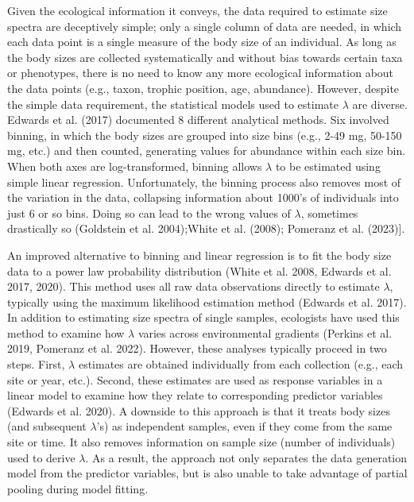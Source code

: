 \documentclass[
  12pt,
]{article}
\begin{document}
Given the ecological information it conveys, the data required to
estimate size spectra are deceptively simple; only a single column of
data are needed, in which each data point is a single measure of the
body size of an individual. As long as the body sizes are collected
systematically and without bias towards certain taxa or phenotypes,
there is no need to know any more ecological information about the data
points (e.g., taxon, trophic position, age, abundance). However, despite
the simple data requirement, the statistical models used to estimate
\(\lambda\) are diverse. Edwards et al. (2017) documented 8 different
analytical methods. Six involved binning, in which the body sizes are
grouped into size bins (e.g., 2-49 mg, 50-150 mg, etc.) and then
counted, generating values for abundance within each size bin. When both
axes are log-transformed, binning allows \(\lambda\) to be estimated
using simple linear regression. Unfortunately, the binning process also
removes most of the variation in the data, collapsing information about
1000's of individuals into just 6 or so bins. Doing so can lead to the
wrong values of \(\lambda\), sometimes drastically so (Goldstein et al.
2004);White et al. (2008); Pomeranz et al. (2023){]}.

An improved alternative to binning and linear regression is to fit the
body size data to a power law probability distribution (White et al.
2008, Edwards et al. 2017, 2020). This method uses all raw data
observations directly to estimate \(\lambda\), typically using the
maximum likelihood estimation method (Edwards et al. 2017). In addition
to estimating size spectra of single samples, ecologists have used this
method to examine how \(\lambda\) varies across environmental gradients
(Perkins et al. 2019, Pomeranz et al. 2022). However, these analyses
typically proceed in two steps. First, \(\lambda\) estimates are
obtained individually from each collection (e.g., each site or year,
etc.). Second, these estimates are used as response variables in a
linear model to examine how they relate to corresponding predictor
variables (Edwards et al. 2020). A downside to this approach is that it
treats body sizes (and subsequent \(\lambda\)'s) as independent samples,
even if they come from the same site or time. It also removes
information on sample size (number of individuals) used to derive
\(\lambda\). As a result, the approach not only separates the data
generation model from the predictor variables, but is also unable to
take advantage of partial pooling during model fitting.
\end{document}

